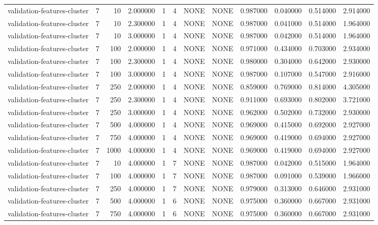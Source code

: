 \begin{tabular}{lrrrllllrrrr}
validation-features-cluster & 7 & 10 & 2.000000 & 1 & 4 & NONE & NONE & 0.987000 & 0.040000 & 0.514000 & 2.914000 \\
validation-features-cluster & 7 & 10 & 2.300000 & 1 & 4 & NONE & NONE & 0.987000 & 0.041000 & 0.514000 & 1.964000 \\
validation-features-cluster & 7 & 10 & 3.000000 & 1 & 4 & NONE & NONE & 0.987000 & 0.042000 & 0.514000 & 1.964000 \\
validation-features-cluster & 7 & 100 & 2.000000 & 1 & 4 & NONE & NONE & 0.971000 & 0.434000 & 0.703000 & 2.934000 \\
validation-features-cluster & 7 & 100 & 2.300000 & 1 & 4 & NONE & NONE & 0.980000 & 0.304000 & 0.642000 & 2.930000 \\
validation-features-cluster & 7 & 100 & 3.000000 & 1 & 4 & NONE & NONE & 0.987000 & 0.107000 & 0.547000 & 2.916000 \\
validation-features-cluster & 7 & 250 & 2.000000 & 1 & 4 & NONE & NONE & 0.859000 & 0.769000 & 0.814000 & 4.305000 \\
validation-features-cluster & 7 & 250 & 2.300000 & 1 & 4 & NONE & NONE & 0.911000 & 0.693000 & 0.802000 & 3.721000 \\
validation-features-cluster & 7 & 250 & 3.000000 & 1 & 4 & NONE & NONE & 0.962000 & 0.502000 & 0.732000 & 2.930000 \\
validation-features-cluster & 7 & 500 & 4.000000 & 1 & 4 & NONE & NONE & 0.969000 & 0.415000 & 0.692000 & 2.927000 \\
validation-features-cluster & 7 & 750 & 4.000000 & 1 & 4 & NONE & NONE & 0.969000 & 0.419000 & 0.694000 & 2.927000 \\
validation-features-cluster & 7 & 1000 & 4.000000 & 1 & 4 & NONE & NONE & 0.969000 & 0.419000 & 0.694000 & 2.927000 \\
validation-features-cluster & 7 & 10 & 4.000000 & 1 & 7 & NONE & NONE & 0.987000 & 0.042000 & 0.515000 & 1.964000 \\
validation-features-cluster & 7 & 100 & 4.000000 & 1 & 7 & NONE & NONE & 0.987000 & 0.091000 & 0.539000 & 1.966000 \\
validation-features-cluster & 7 & 250 & 4.000000 & 1 & 7 & NONE & NONE & 0.979000 & 0.313000 & 0.646000 & 2.931000 \\
validation-features-cluster & 7 & 500 & 4.000000 & 1 & 6 & NONE & NONE & 0.975000 & 0.360000 & 0.667000 & 2.931000 \\
validation-features-cluster & 7 & 750 & 4.000000 & 1 & 6 & NONE & NONE & 0.975000 & 0.360000 & 0.667000 & 2.931000 \\

\end{tabular}
